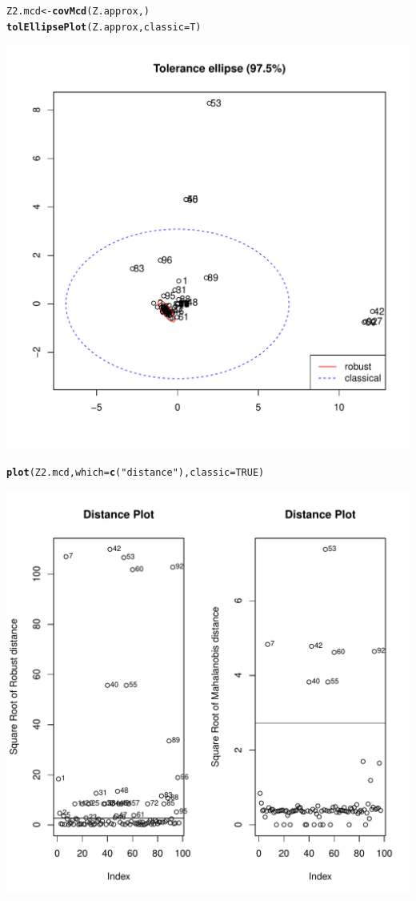\documentclass[a4paper,oneside,12pt,titlepage]{article}\usepackage[]{graphicx}\usepackage[]{color}
\makeatletter
\def\maxwidth{ %
  \ifdim\Gin@nat@width>\linewidth
    \linewidth
  \else
    \Gin@nat@width
  \fi
}
\newcommand{\hlnum}[1]{\textcolor[rgb]{0.686,0.059,0.569}{#1}}%
\newcommand{\hlstr}[1]{\textcolor[rgb]{0.192,0.494,0.8}{#1}}%
\newcommand{\hlstd}[1]{\textcolor[rgb]{0.345,0.345,0.345}{#1}}%
\newcommand{\hlkwb}[1]{\textcolor[rgb]{0.69,0.353,0.396}{#1}}%
\newcommand{\hlkwc}[1]{\textcolor[rgb]{0.333,0.667,0.333}{#1}}%
\newcommand{\hlkwd}[1]{\textcolor[rgb]{0.737,0.353,0.396}{\textbf{#1}}}%
\newenvironment{kframe}{%
 \def\at@end@of@kframe{}%
 \ifinner\ifhmode%
  \def\at@end@of@kframe{\end{minipage}}%
  \begin{minipage}{\columnwidth}%
 \fi\fi%
 \def\FrameCommand##1{\hskip\@totalleftmargin \hskip-\fboxsep
 \colorbox{shadecolor}{##1}\hskip-\fboxsep
     \hskip-\linewidth \hskip-\@totalleftmargin \hskip\columnwidth}%
 \MakeFramed {\advance\hsize-\width
   \@totalleftmargin\z@ \linewidth\hsize
   \@setminipage}}%
 {\par\unskip\endMakeFramed%
 \at@end@of@kframe}
\newenvironment{knitrout}{}{} %
\makeatother
\begin{document}
\begin{knitrout}
\color{fgcolor}\begin{kframe}
\begin{alltt}
\hlstd{Z2.mcd} \hlkwb{<-} \hlkwd{covMcd}\hlstd{(Z.approx,)}
\hlkwd{tolEllipsePlot}\hlstd{(Z.approx,}\hlkwc{classic} \hlstd{= T)}
\end{alltt}
\end{kframe}
\includegraphics[width=\maxwidth]{figure/unnamed-chunk-8-1} 
\begin{kframe}\begin{alltt}
\hlkwd{plot}\hlstd{(Z2.mcd,}\hlkwc{which} \hlstd{=} \hlkwd{c}\hlstd{(}\hlstr{"distance"}\hlstd{),}\hlkwc{classic} \hlstd{=} \hlnum{TRUE}\hlstd{)}
\end{alltt}
\end{kframe}
\includegraphics[width=\maxwidth]{figure/unnamed-chunk-8-2} 

\end{knitrout}
\end{document}
